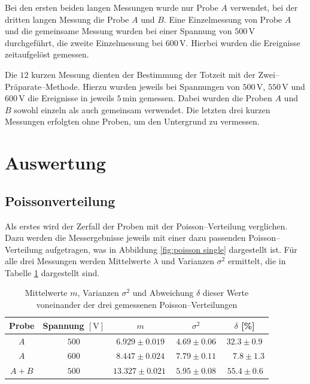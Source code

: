 \documentclass[12pt,a4paper]{scrartcl}
\numberwithin{equation}{section} %
\begin{document}
Bei den ersten beiden langen Messungen wurde nur Probe $A$ verwendet, bei der dritten langen Messung die Probe $A$ und $B$. Eine Einzelmessung von Probe $A$ und die gemeinsame Messung wurden bei einer Spannung von $500\mathrm{\,V}$ durchgeführt, die zweite Einzelmessung bei $600\mathrm{\,V}$. Hierbei wurden die Ereignisse zeitaufgelöst gemessen.

Die $12$ kurzen Messung dienten der Bestimmung der Totzeit mit der Zwei--Präparate--Methode. Hierzu wurden jeweils bei Spannungen von $500\mathrm{\,V}$, $550\mathrm{\,V}$ und $600\mathrm{\,V}$ die Ereignisse in jeweils $5\mathrm{\,min}$ gemessen. Dabei wurden die Proben $A$ und $B$ sowohl einzeln als auch gemeinsam verwendet. Die letzten drei kurzen Messungen erfolgten ohne Proben, um den Untergrund zu vermessen.

\clearpage
\hypertarget{auswertung}{%
\section{Auswertung}\label{auswertung}}

\hypertarget{poissonverteilung}{%
\subsection{Poissonverteilung}\label{poissonverteilung}}
Als erstes wird der Zerfall der Proben mit der Poisson--Verteilung verglichen. Dazu werden die Messergebnisse jeweils mit einer dazu passenden Poisson--Verteilung aufgetragen, was in Abbildung \ref{fig:poisson single} dargestellt ist. Für alle drei Messungen werden Mittelwerte $\lambda$ und Varianzen $\sigma^2$ ermittelt, die in Tabelle \ref{table:poisson} dargestellt sind.

\begin{table}[h!]
	\centering
	\begin{tabular}{c|c|c|c|c}
		Probe & Spannung $[\mathrm{V}]$ & $m$ & $\sigma^2$ & $\delta$ [\%]\\
		\hline
		$A$ & $500$ & $6.929 \pm 0.019$ & $4.69 \pm 0.06$ & $32.3 \pm 0.9$ \\
		$A$ & $600$ & $8.447 \pm 0.024$ & $7.79 \pm 0.11$ & \ \ $7.8 \pm 1.3 $ \\
		$A+B$ & $500$ & $13.327 \pm 0.021\ $ & $5.95 \pm 0.08$ & \,$55.4 \pm 0.6 $ \\
	\end{tabular}
	\caption{Mittelwerte $m$, Varianzen $\sigma^2$ und Abweichung $\delta$ dieser Werte voneinander der drei gemessenen Poisson--Verteilungen}
	\label{table:poisson}
\end{table}
\end{document}
